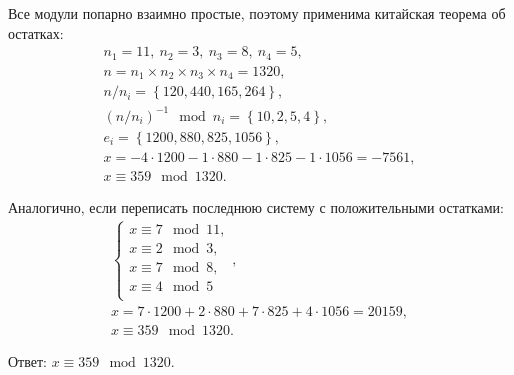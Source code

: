 Все модули попарно взаимно простые, поэтому применима китайская теорема об остатках:
\[\begin{array}{l}
	n_1 = 11, ~ n_2 = 3, ~ n_3 = 8, ~ n_4 = 5, \\
	n = n_1 \times n_2 \times n_3 \times n_4 = 1320, \\
	n / n_i  = \left\{ 120, 440, 165, 264 \right\}, \\
	\left( n / n_i \right)^{-1} \mod n_i = \left\{ 10, 2, 5, 4 \right\}, \\
	e_i = \left\{ 1200, 880, 825, 1056 \right\}, \\
	x = -4 \cdot 1200 - 1 \cdot 880 - 1 \cdot 825 - 1 \cdot 1056 = -7561, \\
	x \equiv 359 \mod 1320.
\end{array}\]

Аналогично, если переписать последнюю систему с положительными остатками:
\[\begin{array}{l}
	\begin{cases}
		x \equiv 7 \mod 11, \\
		x \equiv 2 \mod 3, \\
		x \equiv 7 \mod 8, \\
		x \equiv 4 \mod 5 \\
	\end{cases}, \\
	x = 7 \cdot 1200 + 2 \cdot 880 + 7 \cdot 825 + 4 \cdot 1056 = 20159, \\
	x \equiv 359 \mod 1320.
\end{array}\]

Ответ: $x \equiv 359 \mod 1320$.
\exampleend
